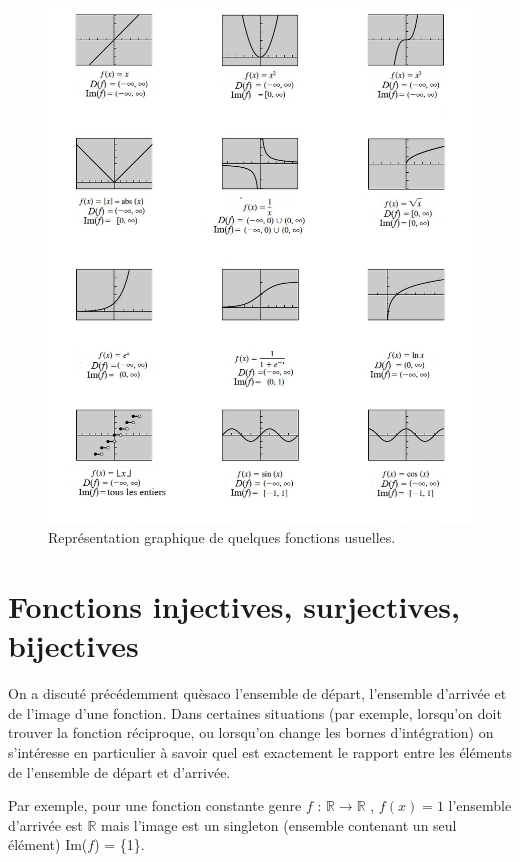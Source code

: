 \begin{figure}[h!]
\centerline{\includegraphics[scale=0.8]{content/graph.png}}
\caption{Représentation graphique de quelques fonctions usuelles.}
\label{montage}
\end{figure}

\section{Fonctions injectives, surjectives, bijectives}
On a discuté précédemment quèsaco l'ensemble de départ, l'ensemble d'arrivée et de l'image d'une fonction. Dans certaines situations (par exemple, lorsqu'on doit trouver la fonction réciproque, ou lorsqu'on change les bornes d'intégration) on s'intéresse en particulier à savoir quel est exactement le rapport entre les éléments de l'ensemble de départ et d'arrivée. 

Par exemple, pour une fonction constante genre $f$ : $\mathbb{R} \to \mathbb{R}$ , $f(x) = 1$ l'ensemble d'arrivée est $\mathbb{R}$ mais l'image est un singleton (ensemble contenant un seul élément) Im($f$) = \{1\}. 


